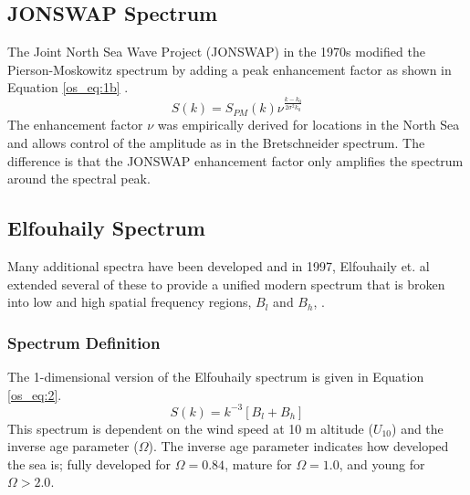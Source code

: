 \subsection{JONSWAP Spectrum}
The Joint North Sea Wave Project (JONSWAP) in the 1970s modified the Pierson-Moskowitz spectrum by adding a peak enhancement factor as shown in Equation \ref{os_eq:1b} \cite{michel_sea_spectra}.
\begin{equation}
  \label{os_eq:1b}
  S(k) = S_{PM}(k)\nu^{\frac{k-k_0}{2\sigma^2k_0}} 
  \end{equation}
The enhancement factor $\nu$ was empirically derived for locations in the North Sea and allows control of the amplitude as in the Bretschneider spectrum. The difference is that the JONSWAP enhancement factor only amplifies the spectrum around the spectral peak.

\subsection{Elfouhaily Spectrum}
Many additional spectra have been developed and in 1997, Elfouhaily et. al extended several of these to provide a unified modern spectrum that is broken into low and high spatial frequency regions, $B_l$ and $B_h$, \cite{elfouhaily}. 

\subsubsection{Spectrum Definition}
The 1-dimensional version of the Elfouhaily spectrum is given in Equation \ref{os_eq:2}.
\begin{equation}
  \label{os_eq:2}
  S(k) = k^{-3}\left[B_l + B_h \right]
\end{equation}
\renewcommand{\baselinestretch}{2} \small\normalsize
This spectrum is dependent on the wind speed at 10 m altitude ($U_{10}$) and the inverse age parameter ($\Omega$). The inverse age parameter indicates how developed the sea is; fully developed for $\Omega = 0.84$, mature for $\Omega = 1.0$, and young for $\Omega > 2.0$. 

